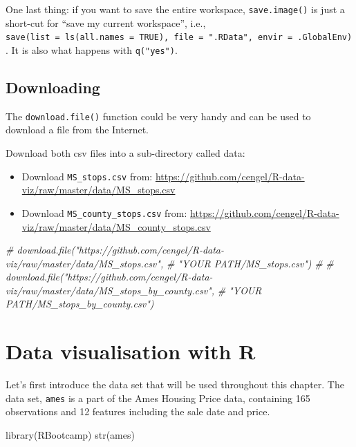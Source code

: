\documentclass[
]{book}
\newenvironment{Shaded}{\begin{snugshade}}{\end{snugshade}}
\newcommand{\CommentTok}[1]{\textcolor[rgb]{0.56,0.35,0.01}{\textit{#1}}}
\newcommand{\FunctionTok}[1]{\textcolor[rgb]{0.00,0.00,0.00}{#1}}
\newcommand{\NormalTok}[1]{#1}
\providecommand{\tightlist}{%
  \setlength{\itemsep}{0pt}\setlength{\parskip}{0pt}}
\begin{document}
One last thing: if you want to save the entire workspace, \texttt{save.image()} is just a short-cut for ``save my current workspace'', i.e., \texttt{save(list\ =\ ls(all.names\ =\ TRUE),\ file\ =\ ".RData",\ envir\ =\ .GlobalEnv)}. It is also what happens with \texttt{q("yes")}.

\hypertarget{downloading}{%
\section{Downloading}\label{downloading}}

The \texttt{download.file()} function could be very handy and can be used to download a file from the Internet.

Download both csv files into a sub-directory called data:

\begin{itemize}
\tightlist
\item
  Download \texttt{MS\_stops.csv} from: \url{https://github.com/cengel/R-data-viz/raw/master/data/MS_stops.csv}
\item
  Download \texttt{MS\_county\_stops.csv} from: \url{https://github.com/cengel/R-data-viz/raw/master/data/MS_county_stops.csv}
\end{itemize}

\begin{Shaded}
\begin{Highlighting}[]
\CommentTok{\# download.file("https://github.com/cengel/R{-}data{-}viz/raw/master/data/MS\_stops.csv", }
\CommentTok{\#               "YOUR PATH/MS\_stops.csv")}
\CommentTok{\# }
\CommentTok{\# download.file("https://github.com/cengel/R{-}data{-}viz/raw/master/data/MS\_stops\_by\_county.csv", }
\CommentTok{\#               "YOUR PATH/MS\_stops\_by\_county.csv")}
\end{Highlighting}
\end{Shaded}

\hypertarget{data-visualisation-with-r}{%
\chapter{Data visualisation with R}\label{data-visualisation-with-r}}

Let's first introduce the data set that will be used throughout this chapter. The data set, \texttt{ames} is a part of the Ames Housing Price data, containing 165 observations and 12 features including the sale date and price.

\begin{Shaded}
\begin{Highlighting}[]
\FunctionTok{library}\NormalTok{(RBootcamp)}
\FunctionTok{str}\NormalTok{(ames)}
\end{Highlighting}
\end{Shaded}
\end{document}
